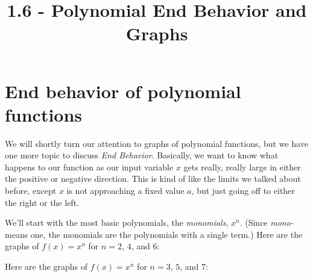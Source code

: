 \documentclass{ximera}
\title{1.6 - Polynomial End Behavior and Graphs}
\begin{document}
\begin{abstract} \end{abstract}
\maketitle



\section{End behavior of polynomial functions}
We will shortly turn our attention to graphs of polynomial functions, but we have one more topic to discuss \emph{End Behavior}.
Basically, we want to know what happens to our function as our input variable $x$ gets really, really large in either the positive or negative direction.
This is kind of like the limits we talked about before, except $x$ is not approaching a fixed value $a$, but just going off to either the right or the left.

We'll start with the most basic polynomials, the \emph{monomials}, $x^n$.  (Since \emph{mono-} means one, the monomials are the polynomials with a single term.)
Here are the graphs of $f(x)=x^n$ for $n = 2$, $4$, and $6$:
	\begin{center}
	\end{center}

	
Here are the graphs of $f(x)=x^n$ for $n = 3$, $5$, and $7$:
	\begin{center}
	\end{center}
\end{document}
